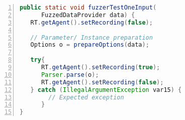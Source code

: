 \begin{lstlisting}[float=t,language=Java,caption={Conceptual decompiled harness showing selective coverage instrumentation through runtime control of JaCoCo's recording state. The coverage handling calls are added using offline instrumentation after compilation.},label={lst:coverage-tracking},float=htbp,basicstyle=\small\ttfamily,numbers=left,numberstyle=\tiny\color{gray},frame=single]
public static void fuzzerTestOneInput(
      FuzzedDataProvider data) {
   RT.getAgent().setRecording(false);

   // Parameter/ Instance preparation
   Options o = prepareOptions(data);

   try{
      RT.getAgent().setRecording(true);
      Parser.parse(o);
      RT.getAgent().setRecording(false);
   } catch (IllegalArgumentException var15) {
        // Expected exception 
      }
}
\end{lstlisting}